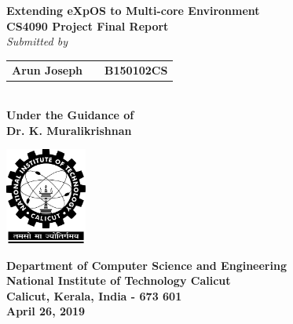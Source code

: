 \documentclass[12pt]{report}
\begin{document}
\begin{titlepage}
\begin{center}
\vspace{1cm}
\huge
\textbf{Extending eXpOS to Multi-core Environment}\\

\normalsize
\textbf{CS4090 Project Final Report}\\
\vspace{1cm}
\emph{Submitted by}\\        
\vspace{0.5cm}
\begin{tabular}{ccc}
\textbf{Arun Joseph}&& \textbf{B150102CS}\\
\end{tabular}\\
\vspace{0.8cm}
\textbf{Under the Guidance of\\Dr. K. Muralikrishnan}\\
\vspace{0.8cm}
\begin{center}
 \includegraphics[width=0.2\textwidth]{nitc-logo.png}
\end{center}
\vspace{0.8cm}
\textbf{Department of Computer Science and Engineering}\\
\textbf{National Institute of Technology Calicut}\\
\textbf{Calicut, Kerala, India - 673 601}\\
\vspace{0.8cm}
\textbf{April 26, 2019}
\end{center}
\end{titlepage}
\end{document}
